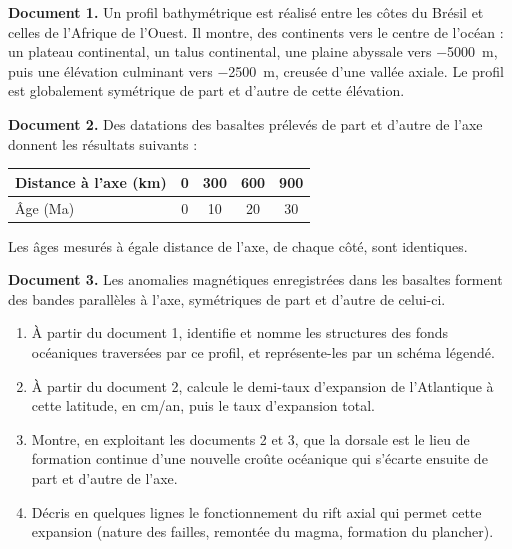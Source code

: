 \documentclass[11pt]{article}
\begin{document}
\begin{exercice}
\textbf{Document 1.} Un profil bathymétrique est réalisé entre les côtes du Brésil et celles de l'Afrique de l'Ouest. Il montre, des continents vers le centre de l'océan : un plateau continental, un talus continental, une plaine abyssale vers \SI{-5000}{m}, puis une élévation culminant vers \SI{-2500}{m}, creusée d'une vallée axiale. Le profil est globalement symétrique de part et d'autre de cette élévation.

\textbf{Document 2.} Des datations des basaltes prélevés de part et d'autre de l'axe donnent les résultats suivants :
\begin{center}
\begin{tabular}{|l|c|c|c|c|}
\hline
\rowcolor{popblueL} Distance à l'axe (km) & 0 & 300 & 600 & 900 \\
\hline
Âge (Ma) & 0 & 10 & 20 & 30 \\
\hline
\end{tabular}
\end{center}
Les âges mesurés à égale distance de l'axe, de chaque côté, sont identiques.

\textbf{Document 3.} Les anomalies magnétiques enregistrées dans les basaltes forment des bandes parallèles à l'axe, symétriques de part et d'autre de celui-ci.

\begin{enumerate}
\item À partir du document 1, identifie et nomme les structures des fonds océaniques traversées par ce profil, et représente-les par un schéma légendé.
\item À partir du document 2, calcule le demi-taux d'expansion de l'Atlantique à cette latitude, en cm/an, puis le taux d'expansion total.
\item Montre, en exploitant les documents 2 et 3, que la dorsale est le lieu de formation continue d'une nouvelle croûte océanique qui s'écarte ensuite de part et d'autre de l'axe.
\item Décris en quelques lignes le fonctionnement du rift axial qui permet cette expansion (nature des failles, remontée du magma, formation du plancher).
\end{enumerate}
\end{exercice}
\end{document}
